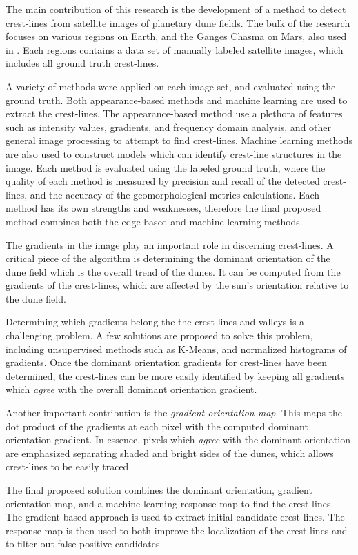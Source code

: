 The main contribution of this research is the development of a method to detect crest-lines from satellite images of planetary dune fields. The bulk of the research focuses on various regions on Earth, and the Ganges Chasma on Mars, also used in \cite{vaz_object_based_dune_analysis}. Each regions contains a data set of manually labeled satellite images, which includes all ground truth crest-lines.

A variety of methods were applied on each image set, and evaluated using the ground truth. Both appearance-based methods and machine learning are used to extract the crest-lines. The appearance-based method use a plethora of features such as intensity values, gradients, and frequency domain analysis, and other general image processing to attempt to find crest-lines. Machine learning methods are also used to construct models which can identify crest-line structures in the image. Each method is evaluated using the labeled ground truth, where the quality of each method is measured by precision and recall of the detected crest-lines, and the accuracy of the geomorphological metrics calculations. Each method has its own strengths and weaknesses, therefore the final proposed method combines both the edge-based and machine learning methods. 

The gradients in the image play an important role in discerning crest-lines. A critical piece of the algorithm is determining the dominant orientation of the dune field which is the overall trend of the dunes. It can be computed from the gradients of the crest-lines, which are affected by the sun's orientation relative to the dune field. 

Determining which gradients belong the the crest-lines and valleys is a challenging problem. A few solutions are proposed to solve this problem, including unsupervised methods such as K-Means, and normalized histograms of gradients. Once the dominant orientation gradients for crest-lines have been determined, the crest-lines can be more easily identified by keeping all gradients which \emph{agree} with the overall dominant orientation gradient.

Another important contribution is the \emph{gradient orientation map}. This maps the dot product of the gradients at each pixel with the computed dominant orientation gradient. In essence, pixels which \emph{agree} with the dominant orientation are emphasized separating shaded and bright sides of the dunes, which allows crest-lines to be easily traced.

The final proposed solution combines the dominant orientation, gradient orientation map, and a machine learning response map to find the crest-lines. The gradient based approach is used to extract initial candidate crest-lines. The response map is then used to both improve the localization of the crest-lines and to filter out false positive candidates.

